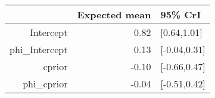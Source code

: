 \begin{tabular}{rrl}
  \hline
 & Expected mean & 95\% CrI \\ 
  \hline
Intercept & 0.82 & [0.64,1.01] \\ 
  phi\_Intercept & 0.13 & [-0.04,0.31] \\ 
  cprior & -0.10 & [-0.66,0.47] \\ 
  phi\_cprior & -0.04 & [-0.51,0.42] \\ 
   \hline
\end{tabular}

